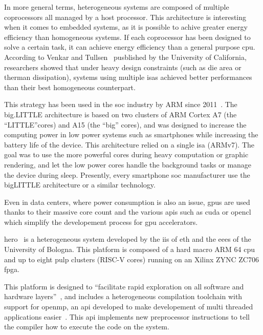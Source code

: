 
	In more general terms, heterogeneous systems are composed of multiple coprocessors all managed by a host processor. This architecture is interesting when it comes to embedded systems, as it is possible to achive greater energy efficiency than homogeneous systems.
	If each coprocessor has been designed to solve a certain task, it can achieve energy efficiency than a general purpose \gls{cpu}. 
	According to Venkar and Tullsen~\cite{Art:Harnessing} pusblished by the University of California,  researchers showed that under heavy design constraints (such as die area or therman dissipation), systems using multiple \glspl{isa} achieved better performances than their best homogeneous counterpart.

This strategy has been used in the \gls{soc} industry by ARM since 2011~\cite{Art:bigLITTLE}. The  big.LITTLE architecture is based on two clusters of ARM Cortex A7 (the ``LITTLE''cores) and A15 (the ``big'' cores), and was designed to increase the computing power in low power systems such as smartphones while increasing the battery life of the device. This architecture relied on a single \gls{isa} (ARMv7). The goal was to use the more powerful cores during heavy computation or graphic rendering, and let the low power cores handle the background tasks or manage the device during sleep.
	Presently, every smartphone \gls{soc} manufacturer use the bigLITTLE architecture or a similar technology.


Even in data centers, where power consumption is also an issue, \glspl{gpu} are used thanks to their massive core count and the various \glspl{api} such as \gls{cuda} or \gls{opencl} which simplify the developement process for \gls{gpu} accelerators.

    \gls{hero}~\cite{Art:Hero} is a heterogeneous system developed by the \gls{iis} of \acrshort{eth} and the \gls{eees} of the University of Bologna.
	This platform is composed of a hard macro ARM 64 \gls{cpu} and up to eight \gls{pulp} clusters (RISC-V cores) running on an Xilinx ZYNC ZC706 \gls{fpga}.

    This platform is designed to ``facilitate rapid exploration on all software and hardware layers''~\cite{Art:Hero}, and includes a heterogeneous compilation toolchain with support for \gls{openmp}, an \gls{api} developed to make developement of multi threaded applications easier~\cite{Web:Wikipedia_OpenMP}. This \gls{api} implements new preprocessor instructions to tell the compiler how to execute the code on the system.



